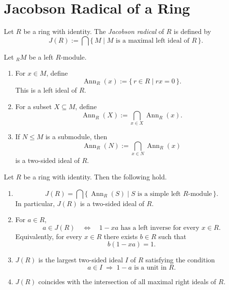 \section{Jacobson Radical of a Ring}

\begin{definition}
    Let $R$ be a ring with identity. The \emph{Jacobson radical} of $R$ is defined by
    \[
        J(R):=\bigcap \{\, M \mid M \text{ is a maximal left ideal of } R \,\}.
    \]
\end{definition}

\begin{remark}[Annihilators]
    Let ${}_RM$ be a left $R$-module.

    \begin{enumerate}
        \item For $x\in M$, define
              \[
                  \operatorname{Ann}_R(x):=\{\,r\in R \mid rx=0\,\}.
              \]
              This is a left ideal of $R$.

        \item For a subset $X\subseteq M$, define
              \[
                  \operatorname{Ann}_R(X):=\bigcap_{x\in X}\operatorname{Ann}_R(x).
              \]

        \item If $N\leq M$ is a submodule, then
              \[
                  \operatorname{Ann}_R(N):=\bigcap_{x\in N}\operatorname{Ann}_R(x)
              \]
              is a two-sided ideal of $R$.
    \end{enumerate}
\end{remark}

\begin{theorem}
    Let $R$ be a ring with identity. Then the following hold.

    \begin{enumerate}
        \item
              \[
                  J(R)=\bigcap \{\,\operatorname{Ann}_R(S)\mid S \text{ is a simple left }R\text{-module}\,\}.
              \]
              In particular, $J(R)$ is a two-sided ideal of $R$.

        \item For $a\in R$,
              \[
                  a\in J(R)
                  \quad\Longleftrightarrow\quad
                  1-xa \text{ has a left inverse for every } x\in R.
              \]
              Equivalently, for every $x\in R$ there exists $b\in R$ such that
              \[
                  b(1-xa)=1.
              \]

        \item $J(R)$ is the largest two-sided ideal $I$ of $R$ satisfying the condition
              \[
                  a\in I \;\Longrightarrow\; 1-a \text{ is a unit in } R.
              \]

        \item $J(R)$ coincides with the intersection of all maximal right ideals of $R$.
    \end{enumerate}
\end{theorem}

